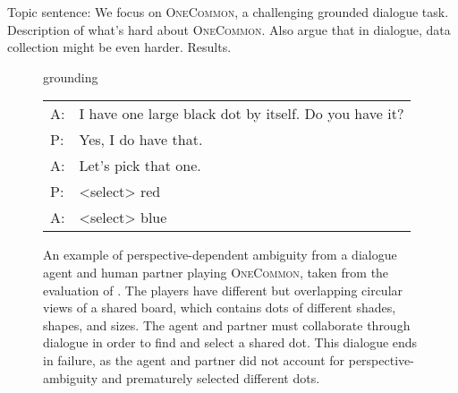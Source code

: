 \documentclass[11pt]{article}
\begin{document}
Topic sentence: We focus on \textsc{OneCommon}, a challenging grounded dialogue task.
Description of what's hard about \textsc{OneCommon}.
Also argue that in dialogue, data collection might be even harder.
Results.

\begin{figure}[t]
\setlength{\abovecaptionskip}{0pt}
grounding

\centering

\scalebox{1.1}{
\begin{tikzpicture}


\filldraw[gray!160] (-.2,.6) circle (.45em); %
\filldraw[gray!40] (-.7,-.3) circle (.4em); %
\filldraw[gray!40] (.4,.1) circle (.3em); %
\filldraw[gray!100] (.8,-.1) circle (.3em); %

\filldraw[gray!140] (-1.3,-1.2) circle (.3em); %
\filldraw[gray!100] (-1.6,-1.8) circle (.3em); %
\filldraw[gray!110] (-.2,-1.1) circle (.4em); %

\filldraw[gray!100] (-1,1.5) circle (.3em); %
\filldraw[gray!100] (-.5,1.6) circle (.38em); %
\filldraw[gray!160] (.8,1.8) circle (.45em); %

\draw[blue,thick] (-.2,.6) circle (.7em);
\draw[red,thick] (.8,1.8) circle (.7em);

\draw[blue,thick] (-.3,-.7) circle (5em);
\draw[red,thick] (.2,1) circle (5em);
\end{tikzpicture}
}

\vspace{1em}

\small
\begin{tabular}[b]{@{}l@{}l@{}}
\toprule
{\color{blue} A}:\;&I have one large black dot by itself. Do you have it? \\
{\color{red} P}:\;&Yes, I do have that. \\
{\color{blue} A}:\;&Let's pick that one. \\
{\color{red} P}:\;&<select> {\color{red} red} \\
{\color{blue} A}:\;&<select> {\color{blue} blue}\\
\bottomrule
\end{tabular}

\vspace{1em}

\caption{
An example of perspective-dependent ambiguity from a dialogue {\color{blue}agent} and human {\color{red}partner} playing \textsc{OneCommon}, taken from the evaluation of \citet{fried}.
The players have different but overlapping circular views of a shared board,
which contains dots of different shades, shapes, and sizes.
The agent and partner must collaborate through dialogue in order to find and
select a shared dot.
This dialogue ends in failure, as the agent and partner did not account for perspective-ambiguity and prematurely selected different dots.
}
\label{fig:oc}
\end{figure}
\end{document}
